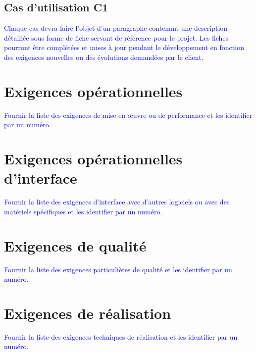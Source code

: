 \documentclass{"../res/univ-projet"}
\begin{document}
\newpage

\subsection{Cas d'utilisation C1}

\textcolor{blue}{
  Chaque cas devra faire l’objet d’un paragraphe contenant une description détaillée 
  sous forme de fiche servant de référence pour le projet. Les fiches pourront être 
  complétées et mises à jour pendant le développement en fonction des exigences 
  nouvelles ou des évolutions demandées par le client.
}

\section{Exigences opérationnelles}

\textcolor{blue}{
  Fournir la liste des exigences de mise en œuvre ou de performance et les identifier par un numéro.
}

\section{Exigences opérationnelles d'interface}

\textcolor{blue}{
  Fournir la liste des exigences d’interface avec d’autres logiciels ou avec des matériels 
  spécifiques et les identifier par un numéro.
}

\section{Exigences de qualité}

\textcolor{blue}{
  Fournir la liste des exigences particulières de qualité et les identifier par un numéro.
}

\section{Exigences de réalisation}

\textcolor{blue}{
  Fournir la liste des exigences techniques de réalisation et les identifier par un numéro.
}
\end{document}
